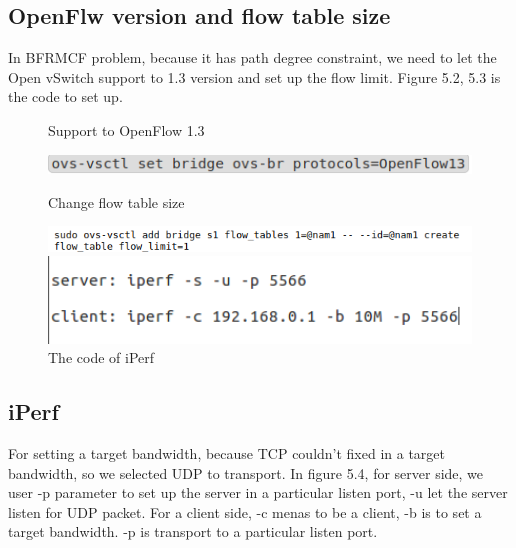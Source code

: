 \documentclass[a4paper,12pt]{report}
\begin{document}
\begin{large}
\subsection{ OpenFlw version and flow table size}	
\qquad In BFRMCF problem, because it has path degree constraint, we need to let the Open vSwitch support to 1.3 version and set up the flow limit. Figure 5.2, 5.3 is the code to set up. 
			\begin{figure}[b]
	          \caption{Support to OpenFlow 1.3}
	          \centering
	            \includegraphics[width=1.0\textwidth]{openflow1_3.png}
	          \caption{Change flow table size}
	            \includegraphics[width=1.0\textwidth]{flow_table.png}
	          \caption{The code of iPerf}
	          \centering
	            \includegraphics[width=1.0\textwidth]{iperf.png}
	      	\end{figure}
\subsection{iPerf}
	\qquad For setting a target bandwidth, because TCP couldn't fixed in a target bandwidth, so we selected UDP to transport. In figure 5.4, for server side, we user -p parameter to set up the server in a particular listen port, -u let the server listen for UDP packet.
	\newline\null\qquad For a client side, -c menas to be a client, -b is to set a target bandwidth. -p is transport to a particular listen port.

\end{large}
\end{document}
